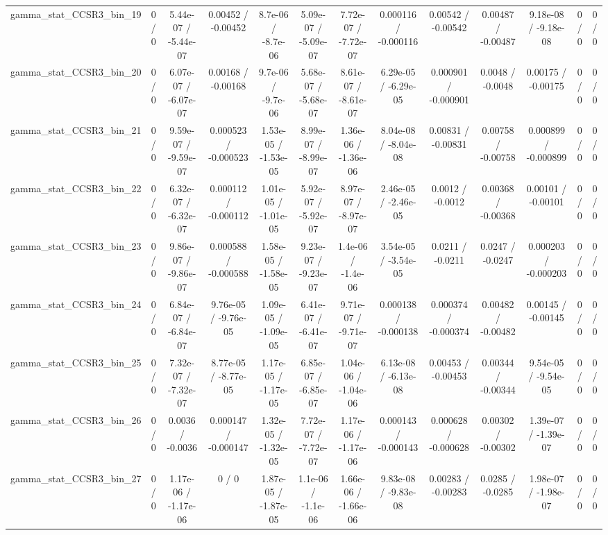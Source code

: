 \documentclass[10pt]{article}
\begin{document}
\begin{table}[htbp]
\begin{center}
\begin{tabular}{|c|c|c|c|c|c|c|c|c|c|c|c|c|}
  gamma_stat_CCSR3_bin_19 & 0 / 0 & 5.44e-07 / -5.44e-07 & 0.00452 / -0.00452 & 8.7e-06 / -8.7e-06 & 5.09e-07 / -5.09e-07 & 7.72e-07 / -7.72e-07 & 0.000116 / -0.000116 & 0.00542 / -0.00542 & 0.00487 / -0.00487 & 9.18e-08 / -9.18e-08 & 0 / 0 & 0 / 0 \\ 
  gamma_stat_CCSR3_bin_20 & 0 / 0 & 6.07e-07 / -6.07e-07 & 0.00168 / -0.00168 & 9.7e-06 / -9.7e-06 & 5.68e-07 / -5.68e-07 & 8.61e-07 / -8.61e-07 & 6.29e-05 / -6.29e-05 & 0.000901 / -0.000901 & 0.0048 / -0.0048 & 0.00175 / -0.00175 & 0 / 0 & 0 / 0 \\ 
  gamma_stat_CCSR3_bin_21 & 0 / 0 & 9.59e-07 / -9.59e-07 & 0.000523 / -0.000523 & 1.53e-05 / -1.53e-05 & 8.99e-07 / -8.99e-07 & 1.36e-06 / -1.36e-06 & 8.04e-08 / -8.04e-08 & 0.00831 / -0.00831 & 0.00758 / -0.00758 & 0.000899 / -0.000899 & 0 / 0 & 0 / 0 \\ 
  gamma_stat_CCSR3_bin_22 & 0 / 0 & 6.32e-07 / -6.32e-07 & 0.000112 / -0.000112 & 1.01e-05 / -1.01e-05 & 5.92e-07 / -5.92e-07 & 8.97e-07 / -8.97e-07 & 2.46e-05 / -2.46e-05 & 0.0012 / -0.0012 & 0.00368 / -0.00368 & 0.00101 / -0.00101 & 0 / 0 & 0 / 0 \\ 
  gamma_stat_CCSR3_bin_23 & 0 / 0 & 9.86e-07 / -9.86e-07 & 0.000588 / -0.000588 & 1.58e-05 / -1.58e-05 & 9.23e-07 / -9.23e-07 & 1.4e-06 / -1.4e-06 & 3.54e-05 / -3.54e-05 & 0.0211 / -0.0211 & 0.0247 / -0.0247 & 0.000203 / -0.000203 & 0 / 0 & 0 / 0 \\ 
  gamma_stat_CCSR3_bin_24 & 0 / 0 & 6.84e-07 / -6.84e-07 & 9.76e-05 / -9.76e-05 & 1.09e-05 / -1.09e-05 & 6.41e-07 / -6.41e-07 & 9.71e-07 / -9.71e-07 & 0.000138 / -0.000138 & 0.000374 / -0.000374 & 0.00482 / -0.00482 & 0.00145 / -0.00145 & 0 / 0 & 0 / 0 \\ 
  gamma_stat_CCSR3_bin_25 & 0 / 0 & 7.32e-07 / -7.32e-07 & 8.77e-05 / -8.77e-05 & 1.17e-05 / -1.17e-05 & 6.85e-07 / -6.85e-07 & 1.04e-06 / -1.04e-06 & 6.13e-08 / -6.13e-08 & 0.00453 / -0.00453 & 0.00344 / -0.00344 & 9.54e-05 / -9.54e-05 & 0 / 0 & 0 / 0 \\ 
  gamma_stat_CCSR3_bin_26 & 0 / 0 & 0.0036 / -0.0036 & 0.000147 / -0.000147 & 1.32e-05 / -1.32e-05 & 7.72e-07 / -7.72e-07 & 1.17e-06 / -1.17e-06 & 0.000143 / -0.000143 & 0.000628 / -0.000628 & 0.00302 / -0.00302 & 1.39e-07 / -1.39e-07 & 0 / 0 & 0 / 0 \\ 
  gamma_stat_CCSR3_bin_27 & 0 / 0 & 1.17e-06 / -1.17e-06 & 0 / 0 & 1.87e-05 / -1.87e-05 & 1.1e-06 / -1.1e-06 & 1.66e-06 / -1.66e-06 & 9.83e-08 / -9.83e-08 & 0.00283 / -0.00283 & 0.0285 / -0.0285 & 1.98e-07 / -1.98e-07 & 0 / 0 & 0 / 0 \\ 

\end{tabular}
\end{center}
\end{table}
\end{document}
